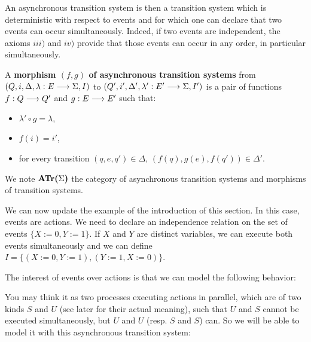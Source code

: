 	
	An asynchronous transition system is then a transition system which is deterministic with respect to events and for which one can declare that two events can occur simultaneously. Indeed, if two events are independent, the axioms $iii)$ and $iv)$ provide that those events can occur in any order, in particular simultaneously. 
	

	A \textbf{morphism $(f,g)$ of asynchronous transition systems} from $(Q,i,\Delta,\lambda : E \longrightarrow \Sigma,I)$ to $(Q',i',\Delta',\lambda' : E' \longrightarrow \Sigma,I')$ is a pair of functions $f : Q \longrightarrow Q'$ and $g : E \longrightarrow E'$ such that:
		\begin{itemize}
			\item $\lambda'\circ g = \lambda$,
			\item $f(i) = i'$,
			\item for every transition $(q,e,q') \in \Delta$, $(f(q),g(e),f(q')) \in \Delta'$.
		\end{itemize}
	We note $\textbf{ATr(}\Sigma\textbf{)}$ the category of asynchronous transition systems and morphisms of transition systems.

	
	
	We can now update the example of the introduction of this section. In this case, events are actions. We need to declare an independence relation on the set of events $\{X:=0,Y:=1\}$. If $X$ and $Y$ are distinct variables, we can execute both events simultaneously and we can define $I = \{(X:=0,Y:=1),(Y:=1, X:=0)\}$.
	
	The interest of events over actions is that we can model the following behavior:
	
		\begin{figure}[H]
			\begin{center}
    				
  			\end{center}
		\end{figure}
	
	You may think it as two processes executing actions in parallel, which are of two kinds $S$ and $U$ (see later for their actual meaning), such that $U$ and $S$ cannot be executed simultaneously, but $U$ and $U$ (resp. $S$ and $S$) can. So we will be able to model it with this asynchronous transition system:
	
		\begin{figure}[H]
			\begin{center}
    				
  			\end{center}
		\end{figure}
	
